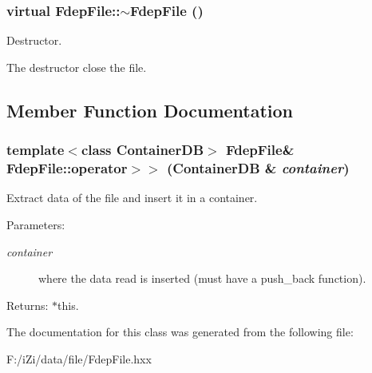 \subsubsection{\setlength{\rightskip}{0pt plus 5cm}virtual Fdep\-File::$\sim$Fdep\-File ()\hspace{0.3cm}{\tt  [inline, virtual]}}\label{class_fdep_file_7f24ec32454849c0756eab48780f02db}


Destructor. 

The destructor close the file. 

\subsection{Member Function Documentation}
\subsubsection{\setlength{\rightskip}{0pt plus 5cm}template$<$class Container\-DB$>$ {\bf Fdep\-File}\& Fdep\-File::operator$>$$>$ (Container\-DB \& {\em container})\hspace{0.3cm}{\tt  [inline]}}\label{class_fdep_file_bc7b742550cb389f78468e52cf4d9b59}


Extract data of the file and insert it in a container. 

\begin{Desc}
\item[Parameters:]
\begin{description}
\item[{\em container}]where the data read is inserted (must have a push\_\-back function). \end{description}
\end{Desc}
\begin{Desc}
\item[Returns:]$\ast$this. \end{Desc}


The documentation for this class was generated from the following file:\begin{CompactItemize}
\item 
F:/i\-Zi/data/file/Fdep\-File.hxx\end{CompactItemize}
